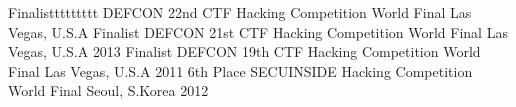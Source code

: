 \begin{cvhonors}
  \cvhonor
    {Finalisttttttttt}
    {DEFCON 22nd CTF Hacking Competition World Final}
    {Las Vegas, U.S.A}
    {}
  \cvhonor
    {Finalist}
    {DEFCON 21st CTF Hacking Competition World Final}
    {Las Vegas, U.S.A}
    {2013}
  \cvhonor
    {Finalist}
    {DEFCON 19th CTF Hacking Competition World Final}
    {Las Vegas, U.S.A}
    {2011}
  \cvhonor
    {6th Place}
    {SECUINSIDE Hacking Competition World Final}
    {Seoul, S.Korea}
    {2012}
\end{cvhonors}